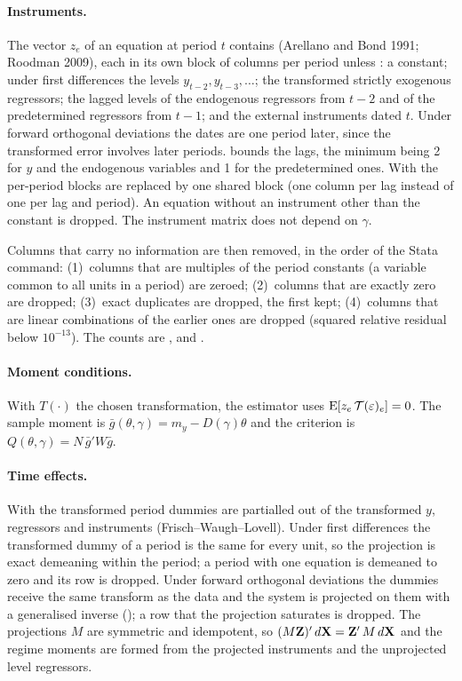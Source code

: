 \paragraph{Instruments.} The vector $z_e$ of an equation at period $t$ contains (Arellano and Bond 1991;
Roodman 2009), each in its own block of columns per period unless :
a constant; under first differences the levels $y_{t-2},y_{t-3},\dots$; the transformed strictly
exogenous regressors; the lagged levels of the endogenous regressors from $t-2$ and of the
predetermined regressors from $t-1$; and the external instruments dated $t$. Under forward
orthogonal deviations the dates are one period later, since the transformed error involves later
periods.  bounds the lags, the minimum being 2 for $y$ and the endogenous
variables and 1 for the predetermined ones. With  the per-period blocks are replaced
by one shared block (one column per lag instead of one per lag and period). An equation without an
instrument other than the constant is dropped. The instrument matrix does not depend on $\gamma$.

Columns that carry no information are then removed, in the order of the Stata command:
(1)~columns that are multiples of the period constants (a variable common to all units in a period)
are zeroed; (2)~columns that are exactly zero are dropped; (3)~exact duplicates are dropped, the
first kept; (4)~columns that are linear combinations of the earlier ones are dropped (squared
relative residual below $10^{-13}$). The counts are ,  and
.

\paragraph{Moment conditions.} With $T(\cdot)$ the chosen transformation, the estimator uses
$\operatorname{E}[z_e\,\mathcal T(\varepsilon)_e]=0$. The sample moment is
$\bar g(\theta,\gamma)=m_y-D(\gamma)\theta$ and the criterion is
$Q(\theta,\gamma)=N\,\bar g'W\bar g$.

\paragraph{Time effects.} With  the transformed period dummies are partialled out of the
transformed $y$, regressors and instruments (Frisch--Waugh--Lovell). Under first differences the
transformed dummy of a period is the same for every unit, so the projection is exact demeaning within
the period; a period with one equation is demeaned to zero and its row is dropped. Under forward
orthogonal deviations the dummies receive the same transform as the data and the system is projected
on them with a generalised inverse (); a row that the projection saturates is dropped.
The projections $M$ are symmetric and idempotent, so $(M\mathbf{Z})'\,d\mathbf{X}=\mathbf{Z}'\,M\,d\mathbf{X}$ and the regime
moments are formed from the projected instruments and the unprojected level regressors.

